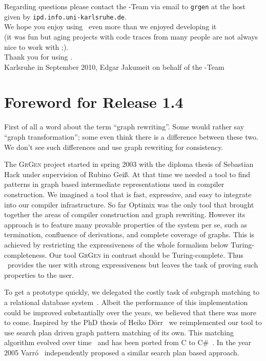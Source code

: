 \noindent Regarding questions please contact the \GrG-Team 
via email to \texttt{grgen} at the host given by \texttt{ipd.info.uni-karlsruhe.de}.\\[1ex]

\noindent We hope you enjoy using \GrG\ even more than we enjoyed developing it\\ {\small(it was fun but aging projects with code traces from many people are not always nice to work with ;).}
\\[1ex]

Thank you for using \GrG.\\[2ex]

\noindent Karlsruhe in September 2010, Edgar Jakumeit on behalf of the \GrG-Team

\pagebreak

\chapter*{Foreword for Release 1.4}
First of all a word about the term ``graph rewriting''.
Some would rather say ``graph transformation''; some even think there is a difference between these two.
We don't see such differences and use graph rewriting for consistency.

The \textsc{GrGen} project started in spring 2003 with the diploma thesis of Sebastian Hack under supervision of Rubino Gei\ss.
At that time we needed a tool to find patterns in graph based intermediate representations used in compiler construction.
We imagined a tool that is fast, expressive, and easy to integrate into our compiler infrastructure.
So far Optimix\cite{assmann00graph} was the only tool that brought together the areas of compiler construction and graph rewriting.
However its approach is to feature many provable properties of the system per se, such as termination, confluence of derivations, and complete coverage of graphs.
This is achieved by restricting the expressiveness of the whole formalism below Turing-completeness.
Our tool \textsc{GrGen} in contrast should be Turing-complete.
Thus \GrG\ provides the user with strong expressiveness but leaves the task of proving such properties to the user.

To get a prototype quickly, we delegated the costly task of subgraph matching to a relational database system~\cite{Hac:03}.
Albeit the performance of this implementation could be improved substantially over the years, we believed that there was more to come.
Inspired by the PhD thesis of Heiko D\"orr~\cite{doerr} we reimplemented our tool to use search plan driven graph pattern matching of its own.
This matching algorithm evolved over time~\cite{adam,Bat:05:SA,Bat:05:DA,Bat:06,BKG:07} and has been ported from C to C\#~\cite{KG:07,Kro:07}. 
In the year 2005 Varr\'o~\cite{gramot2005_adapt} independently proposed a similar search plan based approach.

